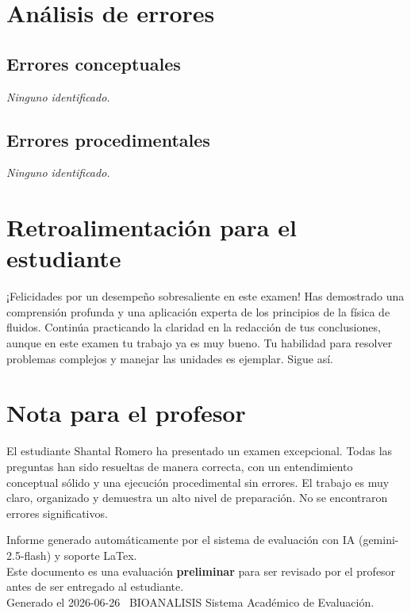 \documentclass[11pt,a4paper]{article}
\begin{document}
\section*{Análisis de errores}

\subsection*{Errores conceptuales}
\textit{Ninguno identificado.}

\subsection*{Errores procedimentales}
\textit{Ninguno identificado.}

\section*{Retroalimentación para el estudiante}
\begin{tcolorbox}[cajaRecomendacion, title={Dirigido a: shantal romero 33093620}]
¡Felicidades por un desempeño sobresaliente en este examen! Has demostrado una comprensión profunda y una aplicación experta de los principios de la física de fluidos. Continúa practicando la claridad en la redacción de tus conclusiones, aunque en este examen tu trabajo ya es muy bueno. Tu habilidad para resolver problemas complejos y manejar las unidades es ejemplar. Sigue así.
\end{tcolorbox}

\section*{Nota para el profesor}
\begin{tcolorbox}[
  enhanced, breakable,
  colback=yellow!8, colframe=yellow!60!black,
  fonttitle=\bfseries, coltitle=black,
  title={Observaciones para revisión manual},
  top=4pt, bottom=4pt, left=8pt, right=8pt,
]
El estudiante Shantal Romero ha presentado un examen excepcional. Todas las preguntas han sido resueltas de manera correcta, con un entendimiento conceptual sólido y una ejecución procedimental sin errores. El trabajo es muy claro, organizado y demuestra un alto nivel de preparación. No se encontraron errores significativos.
\end{tcolorbox}

\vspace{12pt}
\begin{center}
  \footnotesize\color{gray}
  Informe generado automáticamente por el sistema de evaluación con IA (gemini-2.5-flash) y soporte LaTex. \\
  Este documento es una evaluación \textbf{preliminar} para ser revisado por el profesor antes de ser entregado al 
  estudiante. \\
  Generado el 2026-06-26 \textbullet\ BIOANALISIS Sistema Académico de Evaluación.
  \end{center}
\end{document}
